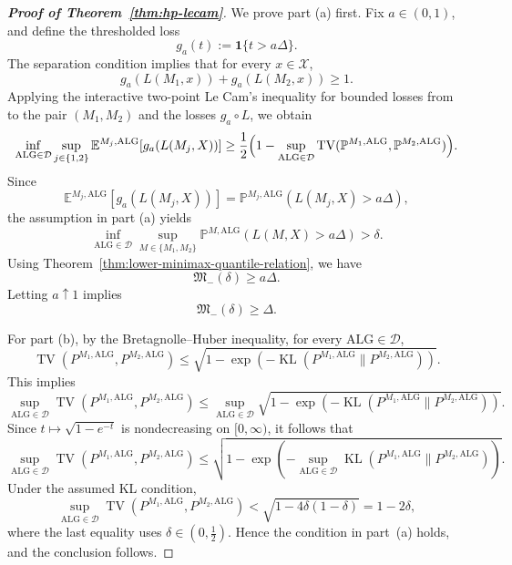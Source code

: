 \documentclass[journal]{IEEEtran}
\newcommand{\ALG}{\mathrm{ALG}}
\newcommand{\TV}{\operatorname{TV}}
\newcommand{\KL}{\operatorname{KL}}
\begin{document}
\begin{proof}[\textbf{Proof of Theorem~\ref{thm:hp-lecam}}]
We prove part (a) first. Fix \(a\in(0,1)\), and define the thresholded loss
\[
g_a(t):=\mathbf 1\{t>a\Delta\}.
\]
The separation condition implies that for every \(x\in\mathcal X\),
\[
g_a(L(M_1,x))+g_a(L(M_2,x))\ge 1.
\]
Applying the interactive two-point Le Cam's inequality for bounded losses from \cite[Prop.~4]{chen2024assouad} to the pair \((M_1,M_2)\) and the losses \(g_a\circ L\), we obtain
\[
\inf_{\ALG\in\mathcal D}\sup_{j\in\{1,2\}}
\mathbb E^{M_j,\ALG}[g_a(L(M_j,X))]
\ge
\frac12\Bigl(1-\sup_{\ALG\in\mathcal D}\TV(\mathbb P^{M_1,\ALG},\mathbb P^{M_2,\ALG})\Bigr).
\]
Since
\[
\mathbb E^{M_j,\ALG}[g_a(L(M_j,X))]
=
\mathbb P^{M_j,\ALG}(L(M_j,X)>a\Delta),
\]
the assumption in part (a) yields
\[
\inf_{\ALG\in\mathcal D}\sup_{M\in\{M_1,M_2\}}
\mathbb P^{M,\ALG}(L(M,X)>a\Delta)
>
\delta.
\]
Using Theorem~\ref{thm:lower-minimax-quantile-relation}, we have
\[
\mathfrak M_{-}(\delta)\ge a\Delta.
\]
Letting \(a\uparrow 1\) implies
\[
\mathfrak M_{-}(\delta)\ge \Delta.
\]

For part (b), by the Bretagnolle--Huber inequality, for every \(\ALG\in\mathcal D\),
\[
\TV(P^{M_1,\ALG},P^{M_2,\ALG})
\le
\sqrt{1-\exp\!\left(
-\KL(P^{M_1,\ALG}\|P^{M_2,\ALG})
\right)}.
\]
This implies
\[
\sup_{\ALG\in\mathcal D}
\TV(P^{M_1,\ALG},P^{M_2,\ALG})
\le
\sup_{\ALG\in\mathcal D}
\sqrt{1-\exp\!\left(
-
\KL(P^{M_1,\ALG}\|P^{M_2,\ALG})
\right)}.
\]
Since \(t\mapsto \sqrt{1-e^{-t}}\) is nondecreasing on \([0,\infty)\), it follows that
\[
\sup_{\ALG\in\mathcal D}
\TV(P^{M_1,\ALG},P^{M_2,\ALG})
\le
\sqrt{1-\exp\!\left(
-\sup_{\ALG\in\mathcal D}
\KL(P^{M_1,\ALG}\|P^{M_2,\ALG})
\right)}.
\]
Under the assumed KL condition,
\[
\sup_{\ALG\in\mathcal D}
\TV(P^{M_1,\ALG},P^{M_2,\ALG})
<
\sqrt{1-4\delta(1-\delta)}
=
1-2\delta,
\]
where the last equality uses \(\delta\in(0,\tfrac12)\). Hence the condition in
part~(a) holds, and the conclusion follows.
\end{proof}
\end{document}

